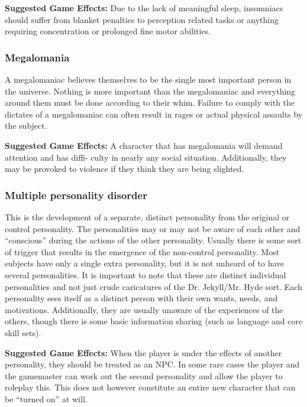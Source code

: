 \textbf{Suggested Game Effects: }Due to the lack of meaningful sleep, insomniacs should suffer from blanket penalties to perception related tasks or anything requiring concentration or prolonged fine motor abilities.

\subsubsection{Megalomania}

A megalomaniac believes themselves to be the single most important person in the universe. Nothing is more important than the megalomaniac and everything around them must be done according to their whim. Failure to comply with the dictates of a megalomaniac can often result in rages or actual physical assaults by the subject.

\textbf{Suggested Game Effects:} A character that has megalomania will demand attention and has diffi- culty in nearly any social situation. Additionally, they may be provoked to violence if they think they are being slighted.

\subsubsection{Multiple personality disorder}

This is the development of a separate, distinct personality from the original or control personality. The personalities may or may not be aware of each other and ``conscious” during the actions of the other personality. Usually there is some sort of trigger that results in the emergence of the non-control personality. Most subjects have only a single extra personality, but it is not unheard of to have several personalities. It is important to note that these are distinct individual personalities and not just crude caricatures of the Dr. Jekyll/Mr. Hyde sort. Each personality sees itself as a distinct person with their own wants, needs, and motivations. Additionally, they are usually unaware of the experiences of the others, though there is some basic information sharing (such as language and core skill sets).

\textbf{Suggested Game Effects:} When the player is under the effects of another personality, they should be treated as an NPC. In some rare cases the player and the gamemaster can work out the second personality and allow the player to roleplay this. This does not however constitute an entire new character that can be ``turned on” at will.


